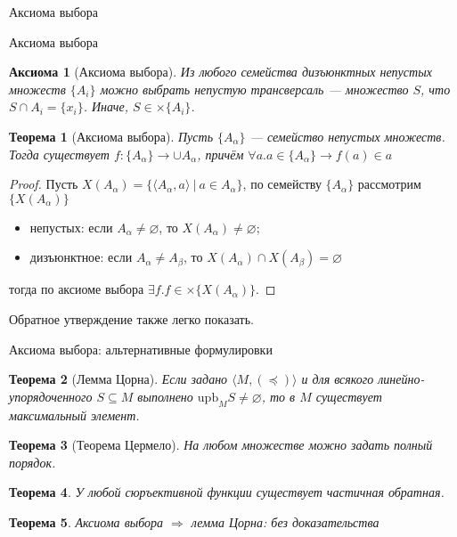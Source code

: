\documentclass[aspectratio=169]{beamer}
\newtheorem{axm}{Аксиома}[section]
\newtheorem{thm}{Теорема}[section]
\begin{document}
\begin{frame}
\begin{center}\LARGE Аксиома выбора \end{center}
\end{frame}

\begin{frame}{Аксиома выбора}
\begin{axm}[Аксиома выбора]
Из любого семейства дизъюнктных непустых множеств $\{A_i\}$ можно выбрать непустую трансверсаль --- 
множество $S$, что $S \cap A_i = \{ x_i \}$. Иначе, $S \in \times \{A_i\}$.
\end{axm}

\begin{thm}[Аксиома выбора]
Пусть $\{A_\alpha\}$ --- семейство непустых множеств. Тогда существует
$f : \{A_\alpha\} \rightarrow \cup A_\alpha$, причём $\forall a.a \in \{A_\alpha\} \rightarrow f(a) \in a$
\end{thm}

\begin{proof}
Пусть $X(A_\alpha) = \{ \langle A_\alpha, a \rangle \ |\ a \in A_\alpha \}$, 
по семейству $\{A_\alpha\}$ рассмотрим $\{X(A_\alpha)\}$
\begin{itemize}
\item непустых: если $A_\alpha \ne \varnothing$, то $X(A_\alpha) \ne \varnothing$;
\item дизъюнктное: если $A_\alpha \ne A_\beta$, то $X(A_\alpha) \cap X(A_\beta) = \varnothing$
\end{itemize}
тогда по аксиоме выбора $\exists f.f \in \times \{ X(A_\alpha) \}$.
\end{proof}
Обратное утверждение также легко показать.
\end{frame}

\begin{frame}{Аксиома выбора: альтернативные формулировки}
\begin{thm}[Лемма Цорна]
Если задано $\langle M, (\preceq) \rangle$ и для всякого линейно-упорядоченного $S \subseteq M$ выполнено
$\text{upb}_M S \ne \varnothing$, то в $M$ существует максимальный элемент.
\end{thm}
\begin{thm}[Теорема Цермело]
На любом множестве можно задать полный порядок.
\end{thm}
\begin{thm}
У любой сюръективной функции существует частичная обратная.
\end{thm}

\begin{thm}
Аксиома выбора $\Rightarrow$ лемма Цорна: без доказательства
\end{thm}
\end{frame}
\end{document}
